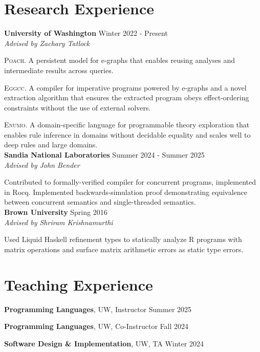 \documentclass[margin, 10pt]{res} %
\begin{document}
\begin{resume}
\section{Research Experience}
{\textbf{University of Washington}} \hfill Winter 2022 - Present \\ 
\textit{Advised by Zachary Tatlock}

\textsc{Poach}. A persistent model for e-graphs that enables reusing analyses and intermediate results across queries.

\textsc{Eggcc}. A compiler for imperative programs powered by e-graphs and a novel extraction algorithm that ensures the extracted program obeys effect-ordering constraints without the use of external solvers. 

\textsc{Enumo}. A domain-specific language for programmable theory exploration that enables rule inference in domains without decidable equality and scales well to deep rules and large domains. \\

{\textbf{Sandia National Laboratories}} \hfill Summer 2024 - Summer 2025 \\
\textit{Advised by John Bender}

Contributed to formally-verified compiler for concurrent programs, implemented in Rocq. Implemented backwards-simulation proof demonstrating equivalence between concurrent semantics and single-threaded semantics. \\

{\textbf{Brown University}} \hfill Spring 2016 \\
\textit{Advised by Shriram Krishnamurthi}

Used Liquid Haskell refinement types to statically analyze R programs with matrix operations and surface matrix arithmetic errors as static type errors.


\section{Teaching Experience}
{\textbf{Programming Languages}}, UW, Instructor \hfill Summer 2025

{\textbf{Programming Languages}}, UW, Co-Instructor \hfill Fall 2024

{\textbf{Software Design \& Implementation}}, UW, TA \hfill Winter 2024


\end{resume}
\end{document}
